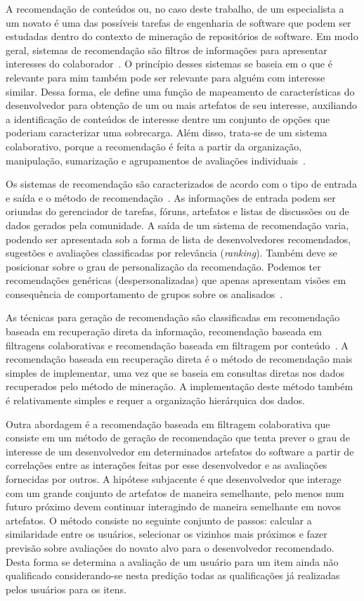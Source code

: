 \documentclass[oneside,brazil,a4paper]{normas-utf-tex}
\begin{document}
A recomendação de conteúdos ou, no caso deste trabalho, de um especialista a um novato é uma das possíveis tarefas de engenharia de software que podem ser estudadas dentro do contexto de mineração de repositórios de software. Em modo geral, sistemas de recomendação são filtros de informações para apresentar interesses do colaborador~\cite{Schafer:2001}. O princípio desses sistemas se baseia em o que é relevante para mim também pode ser relevante para alguém com interesse similar. Dessa forma, ele define uma função de mapeamento de características do desenvolvedor para obtenção de um ou mais artefatos de seu interesse, auxiliando a identificação de conteúdos de interesse dentre um conjunto de opções que poderiam caracterizar uma sobrecarga. Além disso, trata-se de um sistema colaborativo, porque a recomendação é feita a partir da organização, manipulação, sumarização e agrupamentos de avaliações individuais~\cite{Sistemas-etal:2011}. 

Os sistemas de recomendação são caracterizados de acordo com o tipo de entrada e saída e o método de recomendação~\cite{Motta-etal:2011}. As informações de entrada podem ser oriundas do gerenciador de tarefas, fóruns, artefatos e listas de discussões ou de dados gerados pela comunidade. A saída de um sistema de recomendação varia, podendo ser apresentada sob a forma de lista de desenvolvedores recomendados, sugestões e avaliações classificadas por relevância (\textit{ranking}). Também deve se posicionar sobre o grau de personalização da recomendação. Podemos ter recomendações genéricas (despersonalizadas) que apenas apresentam visões em consequência de comportamento de grupos sobre os analisados~\cite{Motta-etal:2011}.

As técnicas para geração de recomendação são classificadas em recomendação baseada em recuperação direta da informação, recomendação baseada em filtragens colaborativas e recomendação baseada em filtragem por conteúdo~\cite{Motta-etal:2011}. A recomendação baseada em recuperação direta é o método de recomendação mais simples de implementar, uma vez que se baseia em consultas diretas nos dados recuperados pelo método de mineração. A implementação deste método também é relativamente simples e requer a organização hierárquica dos dados.

Outra abordagem é a recomendação baseada em filtragem colaborativa que consiste em um método de geração de recomendação que tenta prever o grau de interesse de um desenvolvedor em determinados artefatos do software a partir de correlações entre as interações feitas por esse desenvolvedor e as avaliações fornecidas por outros. A hipótese subjacente é que desenvolvedor que interage com um grande conjunto de artefatos de maneira semelhante, pelo menos num futuro próximo devem continuar interagindo de maneira semelhante em novos artefatos. O método consiste no seguinte conjunto de passos: calcular a similaridade entre os usuários, selecionar os vizinhos mais próximos e fazer previsão sobre avaliações do novato alvo para o desenvolvedor recomendado. Desta forma se determina a avaliação de um usuário para um item ainda não qualificado considerando-se nesta predição todas as qualificações já realizadas pelos usuários para os itens.
\end{document}
